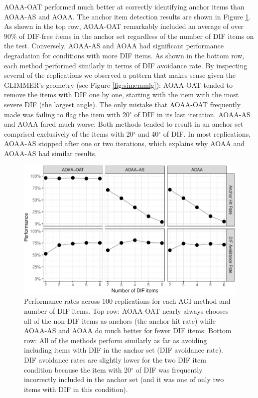 \documentclass[
  english,
  man,floatsintext]{apa6}
\begin{document}
AOAA-OAT performed much better at correctly identifying anchor items than AOAA-AS and AOAA. The anchor item detection results are shown in Figure \ref{fig:anchorfalse}. As shown in the top row, AOAA-OAT remarkably included an average of over \(90\%\) of DIF-free items in the anchor set regardless of the number of DIF items on the test. Conversely, AOAA-AS and AOAA had significant performance degradation for conditions with more DIF items. As shown in the bottom row, each method performed similarly in terms of DIF avoidance rate. By inspecting several of the replications we observed a pattern that makes sense given the GLIMMER's geometry (see Figure \ref{fig:simemmlg}): AOAA-OAT tended to remove the items with DIF one by one, starting with the item with the most severe DIF (the largest angle). The only mistake that AOAA-OAT frequently made was failing to flag the item with 20\(^\circ\) of DIF in its last iteration. AOAA-AS and AOAA fared much worse: Both methods tended to result in an anchor set comprised exclusively of the items with 20\(^\circ\) and 40\(^\circ\) of DIF. In most replications, AOAA-AS stopped after one or two iterations, which explains why AOAA and AOAA-AS had similar results.

\begin{figure}[h]

{\centering \includegraphics{paper_apa_files/figure-latex/anchorfalse-1}

}

\caption{Performance rates across 100 replications for each AGI method and number of DIF items. Top row: AOAA-OAT nearly always chooses all of the non-DIF items as anchors (the anchor hit rate) while AOAA-AS and AOAA do much better for fewer DIF items. Bottom row: All of the methods perform similarly as far as avoiding including items with DIF in the anchor set (DIF avoidance rate). DIF avoidance rates are slightly lower for the two DIF item condition because the item with 20$^\circ$ of DIF was frequently incorrectly included in the anchor set (and it was one of only two items with DIF in this condition).}\label{fig:anchorfalse}
\end{figure}
\end{document}
